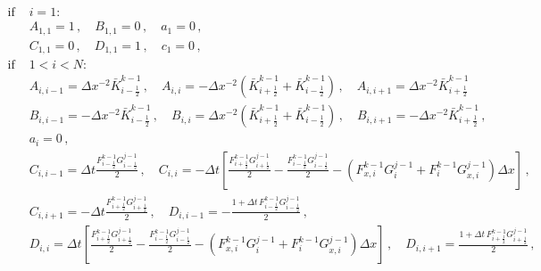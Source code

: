 \documentclass[11pt,a4paper]{article}
\begin{document}
\begin{align}
    \text{if } 
    &i=1:
    \label{eq:lin_algebra_sys:elements}
    \\
    &
    A_{1,1} = 1 
    \,,
    \quad
    B_{1,1} = 0 
    \,, \quad
    a_1 = 0%
    \,,
    \nonumber
    \\
    &
    C_{1,1} = 0
    \,, \quad
    D_{1,1} = 1
    \,, \quad
    c_1 = 0 
    \,,
    \nonumber
    \\
    \text{if } 
    &1<i<N:
    \nonumber
    \\
    &
    A_{i,i-1} = \Delta x ^{-2} \bar{K}^{k-1}_{i-\frac{1}{2}}
    \,, \quad
    A_{i,i} = -\Delta x ^{-2}
        \left(\bar{K}^{k-1}_{i+\frac{1}{2}}+\bar{K}^{k-1}_{i-\frac{1}{2}}\right)
    \,, \quad
    A_{i,i+1} = \Delta x ^{-2} \bar{K}^{k-1}_{i+\frac{1}{2}}
    \nonumber
    \\
    &
    B_{i,i-1} = -\Delta x ^{-2} \bar{K}^{k-1}_{i-\frac{1}{2}}
    \,, \quad
    B_{i,i} = \Delta x ^{-2} 
        \left(\bar{K}^{k-1}_{i+\frac{1}{2}}+\bar{K}^{k-1}_{i-\frac{1}{2}}\right)
    \,, \quad
    B_{i,i+1} = -\Delta x ^{-2} \bar{K}^{k-1}_{i+\frac{1}{2}}
    \,,
    \nonumber
    \\
    &
    a_i = 0
    \,,
    \nonumber
    \\
    &
    C_{i,i-1} = \Delta t \frac{F^{k-1}_{i-\frac{1}{2}} G^{j-1}_{i-\frac{1}{2}}}{2}
    \,, \quad
    C_{i,i} = -\Delta t 
    \left[ 
        \frac{F^{k-1}_{i+\frac{1}{2}} G^{j-1}_{i+\frac{1}{2}}}{2} 
        - \frac{F^{k-1}_{i-\frac{1}{2}} G^{j-1}_{i-\frac{1}{2}}}{2}
        - \left(F^{k-1}_{x,i} G^{j-1}_i + F^{k-1}_i G^{j-1}_{x,i}\right)\Delta x
    \right]
    \,, 
    \nonumber
    \\
    &
    C_{i,i+1} = -\Delta t \frac{F^{k-1}_{i+\frac{1}{2}} G^{j-1}_{i+\frac{1}{2}}}{2}
    \,, \quad
    D_{i,i-1} = - \frac{1 + \Delta t \, F^{k-1}_{i-\frac{1}{2}} G^{j-1}_{i-\frac{1}{2}}}{2}
    \,,
    \nonumber
    \\
    &
    D_{i,i} = \Delta t 
    \left[ 
        \frac{F^{k-1}_{i+\frac{1}{2}} G^{j-1}_{i+\frac{1}{2}}}{2} 
        - \frac{F^{k-1}_{i-\frac{1}{2}} G^{j-1}_{i-\frac{1}{2}}}{2}
        - \left(F^{k-1}_{x,i} G^{j-1}_i + F^{k-1}_i G^{j-1}_{x,i}\right)\Delta x
    \right]
    \,, \quad
    D_{i,i+1} = \frac{1 + \Delta t \, F^{k-1}_{i+\frac{1}{2}} G^{j-1}_{i+\frac{1}{2}}}{2}
    \,,
    \nonumber
    \\
    &

\end{align}
\end{document}
